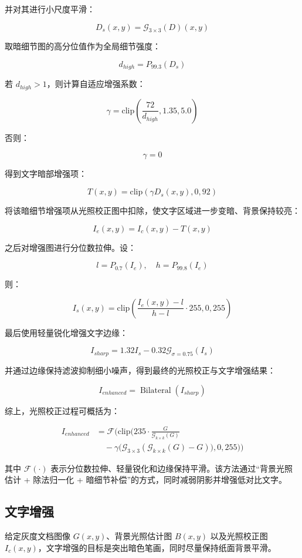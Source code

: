 \documentclass[letterpaper]{article}
\begin{document}
并对其进行小尺度平滑：

\[
D_s(x,y)=\mathcal{G}_{3\times3}(D)(x,y)
\]

取暗细节图的高分位值作为全局细节强度：

\[
d_{high}=P_{99.3}(D_s)
\]

若 \(d_{high}>1\)，则计算自适应增强系数：

\[
\gamma=\mathrm{clip}\left(\frac{72}{d_{high}},1.35,5.0\right)
\]

否则：

\[
\gamma=0
\]

得到文字暗部增强项：

\[
T(x,y)=\mathrm{clip}(\gamma D_s(x,y),0,92)
\]

将该暗细节增强项从光照校正图中扣除，使文字区域进一步变暗、背景保持较亮：

\[
I_e(x,y)=I_c(x,y)-T(x,y)
\]

之后对增强图进行分位数拉伸。设：

\[
l=P_{0.7}(I_e),\quad h=P_{99.8}(I_e)
\]

则：

\[
I_s(x,y)=
\mathrm{clip}\left(
\frac{I_e(x,y)-l}{h-l}\cdot255,
0,255
\right)
\]

最后使用轻量锐化增强文字边缘：

\[
I_{sharp}=1.32I_s-0.32\mathcal{G}_{\sigma=0.75}(I_s)
\]

并通过边缘保持滤波抑制细小噪声，得到最终的光照校正与文字增强结果：

\[
I_{enhanced}=\operatorname{Bilateral}(I_{sharp})
\]

综上，光照校正过程可概括为：

\[
\begin{aligned}
I_{enhanced}
&=
\mathcal{F}\Bigg(
\mathrm{clip}\Big(
235\cdot\frac{G}{\mathcal{G}_{k\times k}(G)} \\
&\quad -
\gamma\big(\mathcal{G}_{3\times3}(\mathcal{G}_{k\times k}(G)-G)\big),
0,255
\Big)
\Bigg)
\end{aligned}
\]

其中 \(\mathcal{F}(\cdot)\) 表示分位数拉伸、轻量锐化和边缘保持平滑。该方法通过“背景光照估计 + 除法归一化 + 暗细节补偿”的方式，同时减弱阴影并增强低对比文字。

\subsection{文字增强}

给定灰度文档图像 \(G(x,y)\)、背景光照估计图 \(B(x,y)\) 以及光照校正图 \(I_c(x,y)\)，文字增强的目标是突出暗色笔画，同时尽量保持纸面背景平滑。
\end{document}
